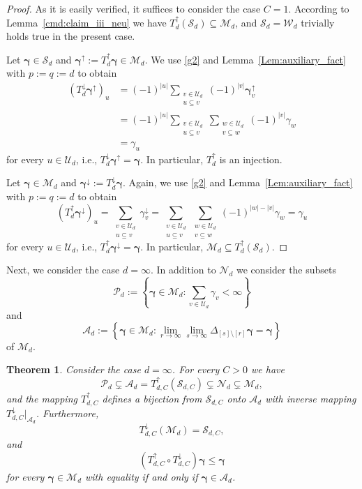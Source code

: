 \documentclass{article}
\newcommand{\bg}{{\boldsymbol{\gamma}}}
\newcommand{\PP} {\mathcal{P}}
\newcommand{\U}  {\mathcal{U}}
\newcommand{\W}  {\mathcal{W}}
\newcommand{\M}  {\mathcal{M}}
\newcommand{\mN}  {\mathcal{N}}
\newcommand{\SSS}{\mathcal{S}}
\newcommand{\A}{\mathcal{A}}
\newcommand{\lo}{\downarrow}
\newcommand{\up}{\uparrow}
\theoremstyle{plain}
\newtheorem{theo}{Theorem}
\theoremstyle{definition}
\begin{document}
\begin{proof}
As it is easily verified,
it suffices to consider the case $C=1$.
According to Lemma~\ref{cmd:claim_iii_neu}
we have
$T^\up_{d}(\SSS_{d}) \subseteq \M_d$, and $\SSS_{d} = \W_d$
trivially holds true in the present case.

Let $\bg \in \SSS_d$ and $\bg^\up := T^\up_d \bg \in \M_d$.
We use \eqref{g2} and Lemma~\ref{Lem:auxiliary_fact} with 
$p := q := d$ to obtain 
\begin{align*}
\left(T^\lo_d \bg^\up\right)_u
&= 
(-1)^{|u|}
\sum_{\substack{v\in \U_d \\ u \subseteq v}} (-1)^{|v|} \bg^\up_v\\
&=
(-1)^{|u|}
\sum_{\substack{v\in \U_d \\ u \subseteq v}} 
\sum_{\substack{w\in \U_d \\ v \subseteq w}} 
(-1)^{|v|} 
\gamma_w\\
&=
\gamma_u
\end{align*}
for every $u \in \U_d$, i.e., $T^\lo_d \bg^\up = \bg$. In
particular, $T^\up_d$ is an injection.

Let $\bg \in \M_d$ and $\bg^\lo := T^\lo_d \bg$.
Again, we use \eqref{g2} and
Lemma~\ref{Lem:auxiliary_fact} with $p := q := d$ 
to obtain
\[
\left(T^\up_d \bg^\lo\right)_u 
= 
\sum_{\substack{v\in \U_d \\ u \subseteq v}} 
\gamma^{\lo}_v
=  
\sum_{\substack{v\in \U_d \\ u \subseteq v}}
\sum_{\substack{w\in \U_d \\ v \subseteq w}} (-1)^{|w|-|v|} \gamma_w
=
\gamma_u
\]
for every $u \in \U_d$, i.e., $T^\up_d \bg^\lo = \bg$.
In particular, $\M_d \subseteq T^\up_d (\SSS_d)$.
\end{proof}

Next, we consider the case $d = \infty$.
In addition to $\mN_d$ we consider the subsets
\[
\PP_d :=
\left\{ \bg \in \M_d : \sum_{v \in \U_d} \gamma_v < \infty \right\}
\]
and 
\begin{equation}\label{def_A_d}
\A_d:= 
\left\{\bg \in \M_d : 
\lim_{r \to \infty} \lim_{s \to \infty} 
\Delta_{[s] \setminus [r]} \bg = \bg
\right\}
\end{equation}
of $\M_d$.

\begin{theo}\label{t1b}
Consider the case $d = \infty$. For every $C > 0$ we have
\begin{equation}\label{range_T_up}
\PP_d \subsetneq \A_d = T^\up_{d,C} (\SSS_{d,C})
\subsetneq \mN_d \subsetneq \M_d,
\end{equation}
and the mapping $T^\up_{d,C}$ defines a bijection from $\SSS_{d,C}$ onto 
$\A_d$ with inverse mapping $T^\lo_{d,C}|_{\A_d}$. Furthermore,
\begin{equation}\label{range_T_lo}
T^\lo_{d,C}(\M_d)  = \SSS_{d,C},
\end{equation}
and
\begin{equation}\label{g77}
(T^{\up}_{d,C} \circ T^{\lo}_{d,C}) \bg \leq \bg 
\end{equation}
for every $\bg \in \M_d$ with equality if and only if $\bg \in \A_d$.
\end{theo}
\end{document}
